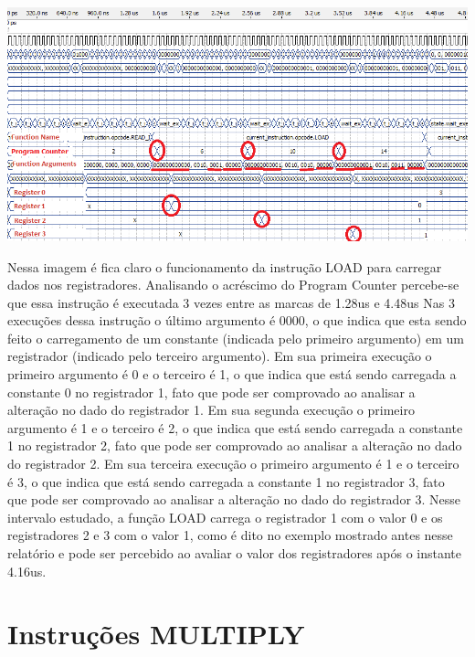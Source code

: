 \documentclass[11pt]{report}
\begin{document}
\includegraphics[width=\textwidth]{load}

Nessa imagem é fica claro o funcionamento da instrução LOAD para carregar dados nos registradores. Analisando o acréscimo do Program Counter percebe-se que essa instrução é executada 3 vezes entre as marcas de 1.28us e 4.48us
Nas 3 execuções dessa instrução o último argumento é 0000, o que indica que esta sendo feito o carregamento de um constante (indicada pelo primeiro argumento) em um registrador (indicado pelo terceiro argumento).
Em sua primeira execução o primeiro argumento é 0 e o terceiro é 1, o que indica que está sendo carregada a constante 0 no registrador 1, fato que pode ser comprovado ao analisar a alteração no dado do registrador 1.
Em sua segunda execução o primeiro argumento é 1 e o terceiro é 2, o que indica que está sendo carregada a constante 1 no registrador 2, fato que pode ser comprovado ao analisar a alteração no dado do registrador 2.
Em sua terceira execução o primeiro argumento é 1 e o terceiro é 3, o que indica que está sendo carregada a constante 1 no registrador 3, fato que pode ser comprovado ao analisar a alteração no dado do registrador 3.
Nesse intervalo estudado, a função LOAD carrega o registrador 1 com o valor 0 e os registradores 2 e 3 com o valor 1, como é dito no exemplo mostrado antes nesse relatório e pode ser percebido ao avaliar o valor dos registradores após o instante 4.16us.

\section{Instruções MULTIPLY}
\end{document}
